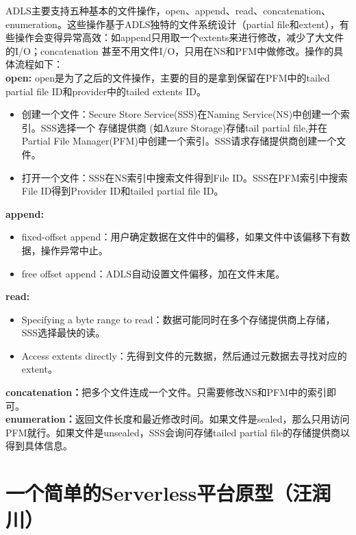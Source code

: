 \documentclass[11pt]{article}
\begin{document}
ADLS主要支持五种基本的文件操作，open、append、read、concatenation、enumeration。这些操作基于ADLS独特的文件系统设计（partial file和extent），有些操作会变得异常高效：如append只用取一个extents来进行修改，减少了大文件的I/O；concatenation 甚至不用文件I/O，只用在NS和PFM中做修改。操作的具体流程如下：\\
\pagebreak
\textbf{open:} 
open是为了之后的文件操作，主要的目的是拿到保留在PFM中的tailed partial file ID和provider中的tailed extents ID。
\begin{itemize}
	\item 创建一个文件：Secure Store Service(SSS)在Naming Service(NS)中创建一个索引。SSS选择一个 存储提供商 (如Azure Storage)存储tail partial file,并在Partial File Manager(PFM)中创建一个索引。SSS请求存储提供商创建一个文件。
	\item 打开一个文件：SSS在NS索引中搜索文件得到File ID。SSS在PFM索引中搜索File ID得到Provider ID和tailed partial file ID。
\end{itemize}
\textbf{append:}
\begin{itemize}
	\item fixed-offset append：用户确定数据在文件中的偏移，如果文件中该偏移下有数据，操作异常中止。
	\item free offset append：ADLS自动设置文件偏移，加在文件末尾。
\end{itemize}
\textbf{read:}
\begin{itemize}
	\item Specifying a byte range to read：数据可能同时在多个存储提供商上存储，SSS选择最快的读。
	\item Access extents directly：先得到文件的元数据，然后通过元数据去寻找对应的extent。
\end{itemize}
\textbf{concatenation：}把多个文件连成一个文件。只需要修改NS和PFM中的索引即可。\\
\textbf{enumeration：}返回文件长度和最近修改时间。如果文件是sealed，那么只用访问PFM就行。如果文件是unsealed，SSS会询问存储tailed partial file的存储提供商以得到具体信息。

\newpage
\section{一个简单的Serverless平台原型（汪润川）}
\end{document}
